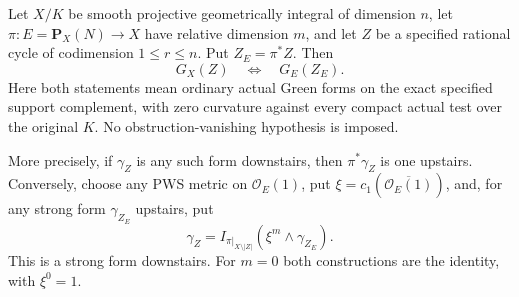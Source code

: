 \begin{theorem}
\label{r16pg:strong-G}
Let $X/K$ be smooth projective geometrically integral of dimension
$n$, let $\pi:E=\mathbf P_X(N)\to X$ have relative dimension $m$,
and let $Z$ be a specified rational cycle of codimension
$1\leq r\leq n$. Put $Z_E=\pi^*Z$. Then
\[
                         G_X(Z)\quad\Longleftrightarrow\quad G_E(Z_E).
 \tag{PG16.5}\label{r16pg:G-equivalence}
\]
Here both statements mean ordinary actual Green forms on the exact
specified support complement, with zero curvature against every
compact actual test over the original $K$. No obstruction-vanishing
hypothesis is imposed.

More precisely, if $\gamma_Z$ is any such form downstairs, then
$\pi^*\gamma_Z$ is one upstairs. Conversely, choose any PWS metric
on $\mathcal O_E(1)$, put $\xi=c_1(\overline{\mathcal O_E(1)})$,
and, for any strong form $\gamma_{Z_E}$ upstairs, put
\[
      \gamma_Z=I_{\pi|_{X\setminus|Z|}}
                         (\xi^m\wedge\gamma_{Z_E}).
 \tag{PG16.6}\label{r16pg:descent-G}
\]
This is a strong form downstairs. For $m=0$ both constructions are
the identity, with $\xi^0=1$.
\end{theorem}


